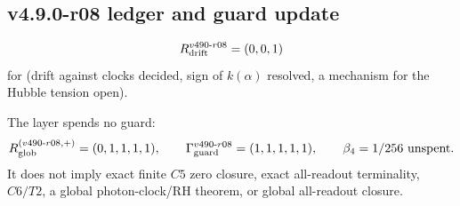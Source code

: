 \subsection*{v4.9.0-r08 ledger and guard update}
\label{subsec:v490-r08-ledger-guard}

\[
R_{\rm drift}^{v490\text{-}r08}=(0,0,1)
\]
for (drift against clocks decided, sign of \(k(\alpha)\) resolved, a mechanism for the Hubble tension open).

The layer spends no guard:
\[
R_{\rm glob}^{(v490\text{-}r08,+)}=(0,1,1,1,1),
\qquad
\Gamma_{\rm guard}^{v490\text{-}r08}=(1,1,1,1,1),
\qquad
\beta_4=1/256\ \text{unspent}.
\]
It does not imply exact finite \(C5\) zero closure, exact all-readout terminality,
\(C6/T2\), a global photon-clock/RH theorem, or global all-readout closure.


